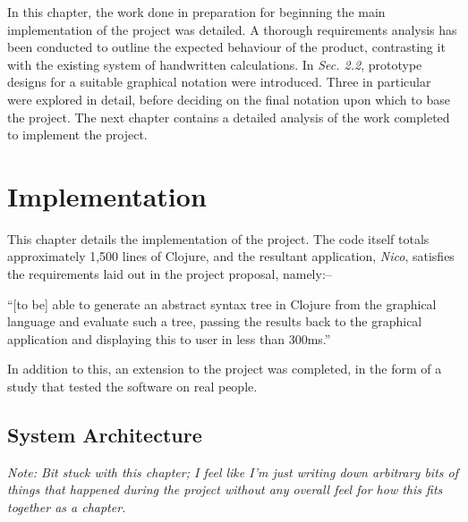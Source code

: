 \documentclass[12pt,twoside,notitlepage,xetex]{report}
\begin{document}
In this chapter, the work done in preparation for beginning the main
implementation of the project was detailed.  A thorough requirements analysis
has been conducted to outline the expected behaviour of the product,
contrasting it with the existing system of handwritten calculations.  In
\emph{Sec. 2.2}, prototype designs for a suitable graphical notation were
introduced.  Three in particular were explored in detail, before deciding on
the final notation upon which to base the project.  The next chapter contains a
detailed analysis of the work completed to implement the project.

\cleardoublepage
\chapter{Implementation}

This chapter details the implementation of the project.  The code itself totals
approximately 1,500 lines of Clojure, and the resultant application,
\emph{Nico}, satisfies the requirements laid out in the project proposal,
namely:--
\begin{center}
\parbox[c]{\textwidth-2cm}{
\small
``[to be] able to generate an abstract syntax tree in Clojure from the graphical language and evaluate such a tree, passing the results back to the graphical application and displaying this to user in less than 300ms.''
}
\end{center}
In addition to this, an extension to the project was completed, in the form of
a study that tested the software on real people.

\section{System Architecture}


\emph{{\sc Note:} Bit stuck with this chapter; I feel like I'm just writing down arbitrary bits of things that happened during the project without any overall feel for how this fits together as a chapter.}
\end{document}
